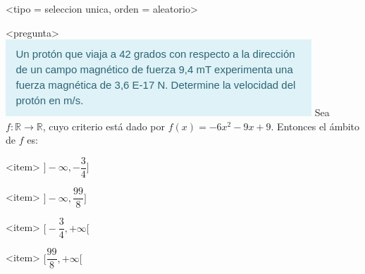 <tipo = seleccion unica, orden = aleatorio>

<pregunta>
\includegraphics{preg1.png}
Sea $f:\mathbb R \to \mathbb R$, cuyo criterio est\'a dado por $f(x) = -6x^2 -9x +9$. Entonces el \'ambito de $f$ es:


<item>
$\bigg]{-}\infty, -\dfrac{3}{4}\bigg]$

<item>
$\bigg]{-}\infty, \dfrac{99}{8}\bigg]$

<item>
$\bigg[-\dfrac{3}{4}, +\infty\bigg[$

<item>
$\bigg[\dfrac{99}{8}, +\infty\bigg[$



